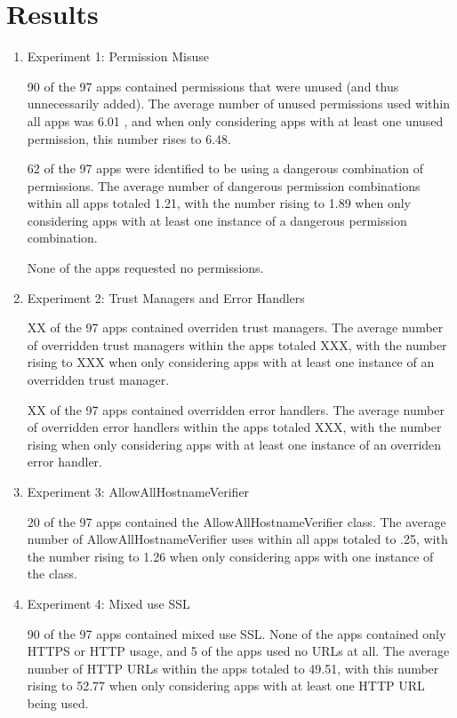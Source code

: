 \section{Results}
\label{sec:discussion}

\begin{enumerate}
    \item Experiment 1: Permission Misuse
    
    90 of the 97 apps contained permissions that were 
    unused (and thus unnecessarily added). The average number 
    of unused permissions used within all apps was 6.01
    , and when only considering apps with at least one 
    unused permission, this number rises to 6.48.

    62 of the 97 apps were identified to be using a dangerous
    combination of permissions. The average number of dangerous permission
    combinations within all apps totaled 1.21, with the number
    rising to 1.89 when only considering apps with at least one
    instance of a dangerous permission combination.

    None of the apps requested no permissions.


    \item Experiment 2: Trust Managers and Error Handlers
    
    XX of the 97 apps contained overriden trust managers.
    The average number of overridden trust managers within the 
    apps totaled XXX, with the number rising to XXX when only 
    considering apps with at least one instance of an overridden trust 
    manager.

    XX of the 97 apps contained overridden error handlers.
    The average number of overridden error handlers within the apps
    totaled XXX, with the number rising when only considering apps
    with at least one instance of an overriden error handler.

    \item Experiment 3: AllowAllHostnameVerifier
    
    20 of the 97 apps contained the AllowAllHostnameVerifier class. 
    The average number of AllowAllHostnameVerifier uses within all
    apps totaled to .25, with the number rising to 1.26 when only
    considering apps with one instance of the class.

    \item Experiment 4: Mixed use SSL
    
    90 of the 97 apps contained mixed use SSL. None of the apps 
    contained only HTTPS or HTTP usage, and 5 of the apps used no 
    URLs at all. The average number of HTTP URLs within the apps 
    totaled to 49.51, with this number rising to 52.77 when only 
    considering apps with at least one HTTP URL being used.


\end{enumerate}
